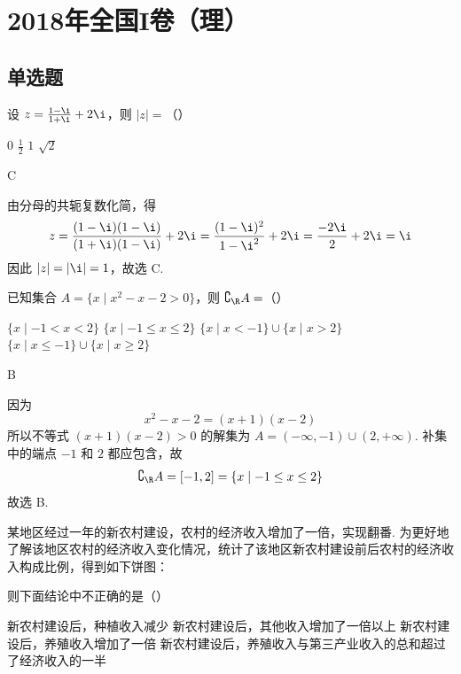 \chapter{2018年全国I卷（理）}

\section{单选题}

\begin{problem}
设 \(z=\frac{1-\i}{1+\i}+2\i\)，则 \(\lvert z\rvert=\)（\quad）

\choices
    {\(0\)}
    {\(\frac12\)}
    {\(1\)}
    {\(\sqrt2\)}
\end{problem}

\begin{answer}
C
\end{answer}

\begin{solution}
由分母的共轭复数化简，得
\[
z=\frac{(1-\i)(1-\i)}{(1+\i)(1-\i)}+2\i
 =\frac{(1-\i)^2}{1-\i^2}+2\i
 =\frac{-2\i}{2}+2\i=\i
\]
因此 \(\lvert z\rvert=\lvert\i\rvert=1\)，故选 C.
\end{solution}

\begin{problem}
已知集合 \(A=\{x\mid x^2-x-2>0\}\)，则 \(\complement_{\R}A=\)（\quad）

\choices
    {\(\{x\mid -1<x<2\}\)}
    {\(\{x\mid -1\le x\le 2\}\)}
    {\(\{x\mid x<-1\}\cup\{x\mid x>2\}\)}
    {\(\{x\mid x\le-1\}\cup\{x\mid x\ge2\}\)}
\end{problem}

\begin{answer}
B
\end{answer}

\begin{solution}
因为
\[
x^2-x-2=(x+1)(x-2)
\]
所以不等式 \((x+1)(x-2)>0\) 的解集为
\(A=(-\infty,-1)\cup(2,+\infty)\).
补集中的端点 \(-1\) 和 \(2\) 都应包含，故
\[
\complement_{\R}A=[-1,2]=\{x\mid -1\le x\le 2\}
\]
故选 B.
\end{solution}

\begin{problem}
某地区经过一年的新农村建设，农村的经济收入增加了一倍，实现翻番. 为更好地了解该地区农村的经济收入变化情况，统计了该地区新农村建设前后农村的经济收入构成比例，得到如下饼图：


则下面结论中不正确的是（\quad）

\choices
    {新农村建设后，种植收入减少}
    {新农村建设后，其他收入增加了一倍以上}
    {新农村建设后，养殖收入增加了一倍}
    {新农村建设后，养殖收入与第三产业收入的总和超过了经济收入的一半}
\end{problem}

